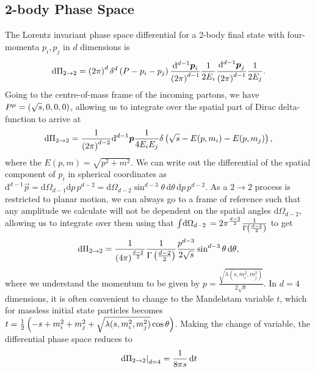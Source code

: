 \documentclass[../main.tex]{subfiles}
\begin{document}
\subsection{2-body Phase Space}
The Lorentz invariant phase space differential for a 2-body final state with
four-momenta \(p_i, p_j\) in \(d\) dimensions is
\begin{equation}
  \mathrm{d}\Pi_{2\to 2} = \left(2\pi\right)^d \delta^d\left(P - p_i -
    p_j\right) \frac{\mathrm{d}^{d-1} \boldsymbol{p}_i}{\left(2\pi\right)^{d-1}}
  \frac{1}{2E_i}
  \frac{\mathrm{d}^{d-1} \boldsymbol{p}_j}{\left(2\pi\right)^{d-1}} \frac{1}{2E_j}.
\end{equation}
Going to the centre-of-mass frame of the incoming partons, we have \(P\^\mu =
\pclosed{\sqrt{s}, 0, 0, 0}\), allowing us to integrate over the spatial part
of Dirac delta-function to arrive at
\begin{equation}
  \mathrm{d}\Pi_{2\to 2} = \frac{1}{\left(2\pi\right)^{d-2}}
  \mathrm{d}^{d-1} \boldsymbol{p} \frac{1}{4E_i E_j} \delta\left(\sqrt{s} -
    E(p, m_i)
    - E(p, m_j)\right),
\end{equation}
where the \(E(p, m) = \sqrt{p^2 + m^2}\).
We can write out the differential of the spatial component of \(p_i\) in
spherical coordinates as \(\mathrm{d}^{d-1} \vec{p} = \mathrm{d}\Omega_{d-1}
\mathrm{d}p \, p^{d-2} = \mathrm{d}\Omega_{d-2} \sin^{d-3}\theta \,
\mathrm{d}\theta \, \mathrm{d}p \, p^{d-2}\).
As a \(2\to 2\) process is restricted to planar motion, we can always go to a
frame of reference such that any amplitude we calculate will not be dependent
on the spatial angles \(\mathrm{d} \Omega_{d-2}\), allowing us to integrate
over them using that \(\int \!\mathrm{d}\Omega_{d-2}\, = 2 \pi^{\frac{d-2}{2}}
\frac{1}{\Gamma\left(\frac{d-2}{2}\right)}\) to get
\begin{equation}
  \mathrm{d}\Pi_{2\to 2} = \frac{1}{\left(4\pi\right)^{\frac{d-2}{2}}}
  \frac{1}{\Gamma\left(\frac{d-2}{2}\right)} \frac{p^{d-3}}{2 \sqrt{s}}
  \sin^{d-3}\theta \,\mathrm{d}\theta,
\end{equation}
where we understand the momentum to be given by \(p = \frac{\sqrt{\lambda(s,
    m_i^2, m_j^2)}}{2\sqrt{s}}\).
In \(d=4\) dimensions, it is often convenient to change to the Mandelstam
variable \(t\), which for massless initial state particles becomes
\(t=\frac{1}{2}
\left(-s+m_i^2+m_j^2+\sqrt{\lambda(s,m_i^2,m_j^2)}\cos\theta\right)\).
Making the change of variable, the differential phase space reduces to
\begin{equation}
  \left.\mathrm{d}\Pi_{2\to 2}\right|_{d=4} = \frac{1}{8\pi s} \,\mathrm{d}t
\end{equation}
\end{document}
